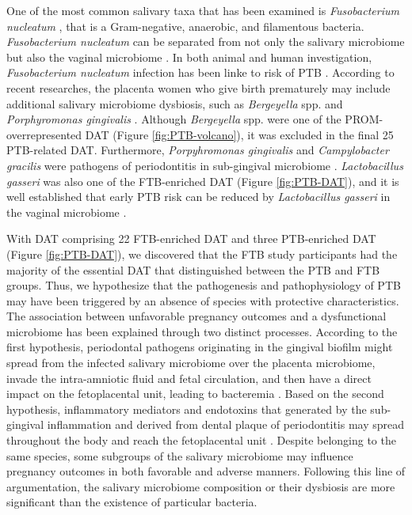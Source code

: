 \documentclass[11pt, a4paper, onecolumn, oneside]{report}
\begin{document}
            One of the most common salivary taxa that has been examined is \textit{Fusobacterium nucleatum} \cite{Fusobacterium-1, Fusobacterium-2, Fusobacterium-3}, that is a Gram-negative, anaerobic, and filamentous bacteria. \textit{Fusobacterium nucleatum} can be separated from not only the salivary microbiome but also the vaginal microbiome \cite{PTB-mechanism-7, PTB-mechanism-8}. In both animal and human investigation, \textit{Fusobacterium nucleatum} infection has been linke to risk of PTB \cite{Fusobacterium-4}. According to recent researches, the placenta women who give birth prematurely may include additional salivary microbiome dysbiosis, such as \textit{Bergeyella} spp. and \textit{Porphyromonas gingivalis} \cite{Porphyromonas-1, Porphyromonas-2}. Although \textit{Bergeyella} spp. were one of the PROM-overrepresented DAT (Figure \ref{fig:PTB-volcano}), it was excluded in the final 25 PTB-related DAT. Furthermore,  \textit{Porpyhromonas gingivalis} and \textit{Campylobacter gracilis} were pathogens of periodontitis in sub-gingival microbiome \cite{PTB-mechanism-9}. \textit{Lactobacillus gasseri} was also one of the FTB-enriched DAT (Figure \ref{fig:PTB-DAT}), and it is well established that early PTB risk can be reduced by \textit{Lactobacillus gasseri} in the vaginal microbiome \cite{PTB-mechanism-10, PTB-mechanism-11}.

            With DAT comprising 22 FTB-enriched DAT and three PTB-enriched DAT (Figure \ref{fig:PTB-DAT}), we discovered that the FTB study participants had the majority of the essential DAT that distinguished between the PTB and FTB groups. Thus, we hypothesize that the pathogenesis and pathophysiology of PTB may have been triggered by an absence of species with protective characteristics. The association between unfavorable pregnancy outcomes and a dysfunctional microbiome has been explained through two distinct processes. According to the first hypothesis, periodontal pathogens originating in the gingival biofilm might spread from the infected salivary microbiome over the placenta microbiome, invade the intra-amniotic fluid and fetal circulation, and then have a direct impact on the fetoplacental unit, leading to bacteremia \cite{Periodontitis-1}. Based on the second hypothesis, inflammatory mediators and endotoxins that generated by the sub-gingival inflammation and derived from dental plaque of periodontitis may spread throughout the body and reach the fetoplacental unit \cite{PTB-mechanism-12, PTB-mechanism-13}. Despite belonging to the same species, some subgroups of the salivary microbiome may influence pregnancy outcomes in both favorable and adverse manners. Following this line of argumentation, the salivary microbiome composition or their dysbiosis are more significant than the existence of particular bacteria.
\end{document}

